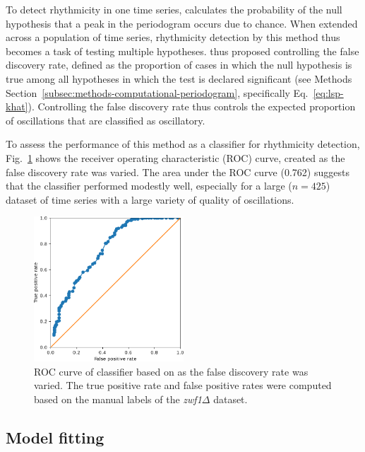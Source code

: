 To detect rhythmicity in one time series, \textcite{glynnDetectingPeriodicPatterns2006} calculates the probability of the null hypothesis that a peak in the periodogram occurs due to chance.
When extended across a population of time series, rhythmicity detection by this method thus becomes a task of testing multiple hypotheses.
\textcite{glynnDetectingPeriodicPatterns2006} thus proposed controlling the false discovery rate, defined as the proportion of cases in which the null hypothesis is true among all hypotheses in which the test is declared significant (see Methods Section~\ref{subsec:methods-computational-periodogram}, specifically Eq.\ \ref{eq:lsp-khat}).
Controlling the false discovery rate thus controls the expected proportion of oscillations that are classified as oscillatory.

To assess the performance of this method as a classifier for rhythmicity detection, Fig.\ \ref{fig:glynn-roc} shows the receiver operating characteristic (ROC) curve, created as the false discovery rate was varied.
The area under the ROC curve (0.762) suggests that the classifier performed modestly well, especially for a large ($n=425$) dataset of time series with a large variety of quality of oscillations.

\begin{figure}[hb!]
  \centering
  \includegraphics[width=0.5\textwidth]{glynn_is20016_5_edit.pdf}
  \caption[
    ROC curve of classifier based on \textcite{glynnDetectingPeriodicPatterns2006}.
  ]{
    ROC curve of classifier based on \textcite{glynnDetectingPeriodicPatterns2006} as the false discovery rate was varied.
    The true positive rate and false positive rates were computed based on the manual labels of the \textit{zwf1$\Delta$} dataset.
  }
  \label{fig:glynn-roc}
\end{figure}


\subsection{Model fitting}
\label{subsec:analysis-classification-ar}

